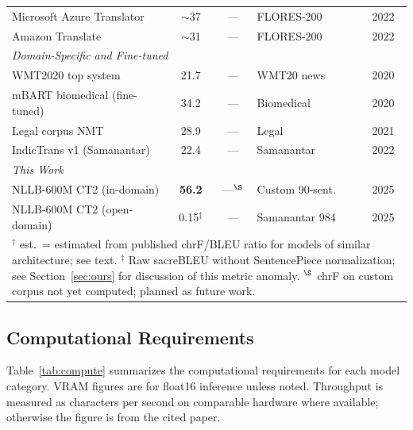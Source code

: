 \documentclass[conference]{IEEEtran}
\begin{document}
\begin{table}[t]
\begin{tabular}{p{3.4cm} c c p{1.7cm} c}
    Microsoft Azure Translator   & $\sim$37 & ---                & FLORES-200  & 2022 \\
    Amazon Translate             & $\sim$31 & ---                & FLORES-200  & 2022 \\
    \midrule
    \multicolumn{5}{l}{\textit{Domain-Specific and Fine-tuned}} \\
    WMT2020 top system           & 21.7  & ---  & WMT20 news  & 2020 \\
    mBART biomedical (fine-tuned)& 34.2  & ---  & Biomedical  & 2020 \\
    Legal corpus NMT             & 28.9  & ---  & Legal       & 2021 \\
    IndicTrans v1 (Samanantar)   & 22.4  & ---  & Samanantar  & 2022 \\
    \midrule
    \multicolumn{5}{l}{\textit{This Work}} \\
    NLLB-600M CT2 (in-domain)    & \textbf{56.2} & ---$^\S$ & Custom 90-sent. & 2025 \\
    NLLB-600M CT2 (open-domain)  & 0.15$^\ddagger$ & --- & Samanantar 984 & 2025 \\
    \bottomrule
    \multicolumn{5}{p{13cm}}{\scriptsize
      $^\dagger$ est.\ = estimated from published chrF/BLEU ratio for models of
      similar architecture; see text.
      $^\ddagger$ Raw sacreBLEU without SentencePiece normalization; see
      Section~\ref{sec:ours} for discussion of this metric anomaly.
      $^\S$ chrF on custom corpus not yet computed; planned as future work.}
  \end{tabular}
\end{table}

\subsection{Computational Requirements}

Table~\ref{tab:compute} summarizes the computational requirements for
each model category.
VRAM figures are for float16 inference unless noted.
Throughput is measured as characters per second on comparable hardware
where available; otherwise the figure is from the cited paper.
\end{document}
